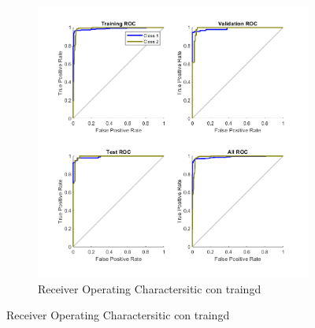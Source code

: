 \documentclass[a4paper, 12pt]{article}
\begin{document}
\begin{figure}[htp!]
\begin{subfigure}{0.49\textwidth}
                        \includegraphics[width=\textwidth]{figures/parte1/Ej4/ej4_roc_traingd_60.png}
                        \caption{Receiver Operating Charactersitic con traingd}
                    \end{subfigure}
                \end{figure}

            \newpage
\end{document}
